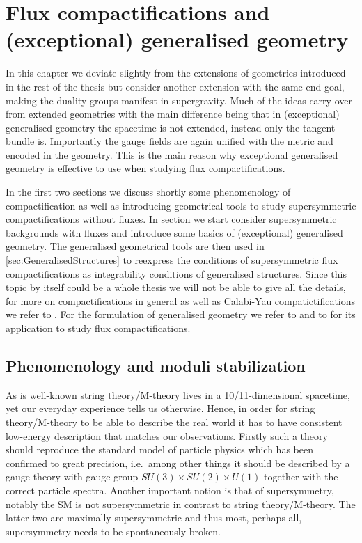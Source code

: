 \chapter{Flux compactifications and (exceptional) generalised
geometry\label{chap:FluxCompactifications}}

In this chapter we deviate slightly from the extensions of geometries introduced in the rest of the thesis but consider another extension with the same end-goal, making the duality groups manifest in supergravity. Much of the ideas carry over from extended geometries with the main difference being that in (exceptional) generalised geometry the spacetime is not extended, instead only the tangent bundle is. Importantly the gauge fields are again unified with the metric and encoded in the geometry. This is the main reason why exceptional generalised geometry is effective to use when studying flux compactifications. 

In the first two sections we discuss shortly some phenomenology of compactification as well as introducing geometrical tools to study supersymmetric compactifications without fluxes. In section we start consider supersymmetric backgrounds with fluxes and introduce some basics of (exceptional) generalised geometry. The generalised geometrical tools are then used in \ref{sec:GeneralisedStructures} to reexpress the conditions of supersymmetric flux compactifications as integrability conditions of generalised structures. Since this topic by itself could be a whole thesis we will not be able to give all the details, for more on compactifications in general as well as Calabi-Yau compatictifications we refer to \cite{Blumenhagen2013,Grana:2005jc}. For the formulation of generalised geometry we refer to \cite{Hull:2007zu,Coimbra:2011ky,Coimbra:2011nw} and to \cite{Ashmore:2015joa,Grana:2009im} for its application to study flux compactifications. 

\section{Phenomenology and moduli stabilization}
As is well-known string theory/M-theory lives in a 10/11-dimensional spacetime, yet our everyday experience tells us otherwise. Hence, in order for string theory/M-theory to be able to describe the real world it has to have consistent low-energy description that matches our observations. Firstly such a theory should reproduce the standard model of particle physics which has been confirmed to great precision, i.e.\ among other things it should be described by a gauge theory with gauge group $SU(3)\times SU(2)\times U(1)$ together with the correct particle spectra. Another important notion is that of supersymmetry, notably the SM is not supersymmetric in contrast to string theory/M-theory. The latter two are maximally supersymmetric and thus most, perhaps all, supersymmetry needs to be spontaneously broken. %

